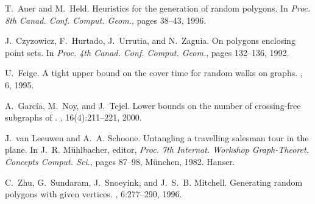 \pdfoutput=1  \documentclass{article}
\begin{document}
\begin{thebibliography}{CHUZ92}

T.~Auer and M.~Held.
\newblock Heuristics for the generation of random polygons.
\newblock In {\em Proc. 8th Canad. Conf. Comput. Geom.}, pages 38--43, 1996.

J.~Czyzowicz, F.~Hurtado, J.~Urrutia, and N.~Zaguia.
\newblock On polygons enclosing point sets.
\newblock In {\em Proc. 4th Canad. Conf. Comput. Geom.}, pages 132--136, 1992.

U.~Feige.
\newblock A tight upper bound on the cover time for random walks on graphs.
, 6, 1995.

A.~Garc{\'i}a, M.~Noy, and J.~Tejel.
\newblock Lower bounds on the number of crossing-free subgraphs of .
, 16(4):211--221, 2000.

J.~van Leeuwen and A.~A. Schoone.
\newblock Untangling a travelling salesman tour in the plane.
\newblock In J.~R. M{\"u}hlbacher, editor, {\em Proc. 7th Internat. Workshop
  Graph-Theoret. Concepts Comput. Sci.}, pages 87--98, M{\"u}nchen, 1982.
  Hanser.

C.~Zhu, G.~Sundaram, J.~Snoeyink, and J.~S.~B. Mitchell.
\newblock Generating random polygons with given vertices.
, 6:277--290, 1996.

\end{thebibliography}

\normalsize

\newpage
\end{document}
